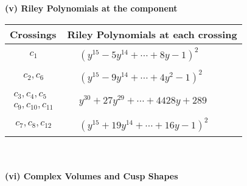 \documentclass[1p]{elsarticle_modified}
\theoremstyle{definition}
\begin{document}
\newpage\renewcommand{\arraystretch}{1}
\flushleft \textbf{(v) Riley Polynomials at the component}\newline \\
\begin{tabular}{m{50pt}|m{274pt}}
Crossings & \hspace{64pt}Riley Polynomials at each crossing \\
\hline $$\begin{aligned}c_{1}\end{aligned}$$&$\begin{aligned}
&(y^{15}-5 y^{14}+\cdots+8 y-1)^{2}
\end{aligned}$\\
\hline $$\begin{aligned}c_{2},c_{6}\end{aligned}$$&$\begin{aligned}
&(y^{15}-9 y^{14}+\cdots+4 y^2-1)^{2}
\end{aligned}$\\
\hline $$\begin{aligned}c_{3},c_{4},c_{5}\\c_{9},c_{10},c_{11}\end{aligned}$$&$\begin{aligned}
&y^{30}+27 y^{29}+\cdots+4428 y+289
\end{aligned}$\\
\hline $$\begin{aligned}c_{7},c_{8},c_{12}\end{aligned}$$&$\begin{aligned}
&(y^{15}+19 y^{14}+\cdots+16 y-1)^{2}
\end{aligned}$\\
\hline
\end{tabular}\\~\\
\newpage\flushleft \textbf{(vi) Complex Volumes and Cusp Shapes}
\end{document}
